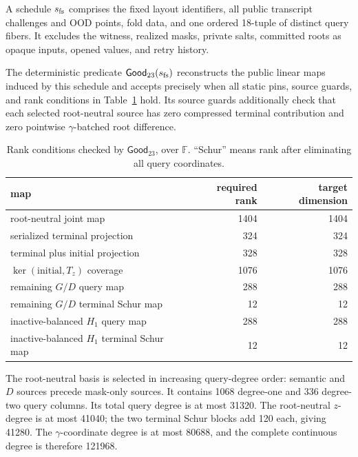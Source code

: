 \begin{definition}
\label{def:profile23-schedule}
A \Profile{} schedule \(s_{\rm fs}\) comprises the fixed layout identifiers,
all public transcript challenges and OOD points, fold data, and one ordered
18-tuple of distinct query fibers.  It excludes the witness, realized masks,
private salts, committed roots as opaque inputs, opened values, and retry
history.
\end{definition}

The deterministic predicate \(\mathsf{Good}_{23}(s_{\rm fs})\) reconstructs
the public linear maps induced by this schedule and accepts precisely when
all static pins, source guards, and rank conditions in
Table~\ref{tab:good23-ranks} hold.  Its source guards additionally check that
each selected root-neutral source has zero compressed terminal contribution
and zero pointwise \(\gamma\)-batched root difference.

\begin{table}[t]
\centering
\caption{Rank conditions checked by \(\mathsf{Good}_{23}\), over
\(\mathbb F\).  ``Schur'' means rank after eliminating all query coordinates.}
\label{tab:good23-ranks}
\begin{tabular}{@{}lrr@{}}
\toprule
map & required rank & target dimension \\
\midrule
root-neutral joint map & 1404 & 1404 \\
serialized terminal projection & 324 & 324 \\
terminal plus initial projection & 328 & 328 \\
\(\ker(\mathrm{initial},T_z)\) coverage & 1076 & 1076 \\
remaining \(G/D\) query map & 288 & 288 \\
remaining \(G/D\) terminal Schur map & 12 & 12 \\
inactive-balanced \(H_1\) query map & 288 & 288 \\
inactive-balanced \(H_1\) terminal Schur map & 12 & 12 \\
\bottomrule
\end{tabular}
\end{table}

The root-neutral basis is selected in increasing query-degree order:
semantic and \(D\) sources precede mask-only sources.  It contains 1068
degree-one and 336 degree-two query columns.  Its total query degree is at
most 31320.  The root-neutral \(z\)-degree is at most 41040; the two terminal
Schur blocks add 120 each, giving 41280.  The \(\gamma\)-coordinate degree is
at most 80688, and the complete continuous degree is therefore 121968.


